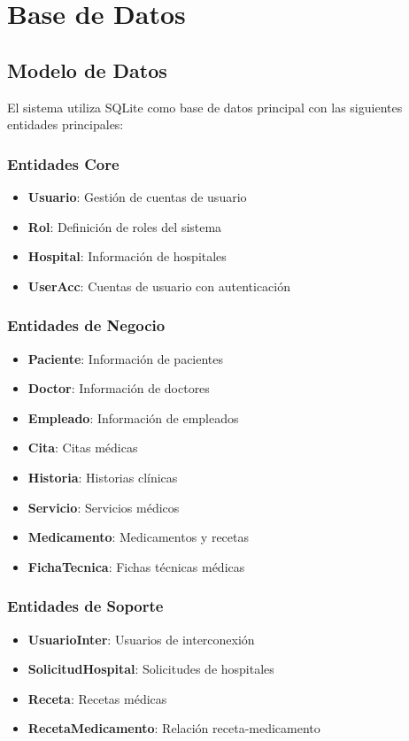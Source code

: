 \documentclass[12pt,a4paper]{article}
\begin{document}
\section{Base de Datos}

\subsection{Modelo de Datos}

El sistema utiliza SQLite como base de datos principal con las siguientes entidades principales:

\subsubsection{Entidades Core}
\begin{itemize}
    \item \textbf{Usuario}: Gestión de cuentas de usuario
    \item \textbf{Rol}: Definición de roles del sistema
    \item \textbf{Hospital}: Información de hospitales
    \item \textbf{UserAcc}: Cuentas de usuario con autenticación
\end{itemize}

\subsubsection{Entidades de Negocio}
\begin{itemize}
    \item \textbf{Paciente}: Información de pacientes
    \item \textbf{Doctor}: Información de doctores
    \item \textbf{Empleado}: Información de empleados
    \item \textbf{Cita}: Citas médicas
    \item \textbf{Historia}: Historias clínicas
    \item \textbf{Servicio}: Servicios médicos
    \item \textbf{Medicamento}: Medicamentos y recetas
    \item \textbf{FichaTecnica}: Fichas técnicas médicas
\end{itemize}

\subsubsection{Entidades de Soporte}
\begin{itemize}
    \item \textbf{UsuarioInter}: Usuarios de interconexión
    \item \textbf{SolicitudHospital}: Solicitudes de hospitales
    \item \textbf{Receta}: Recetas médicas
    \item \textbf{RecetaMedicamento}: Relación receta-medicamento
\end{itemize}
\end{document}
